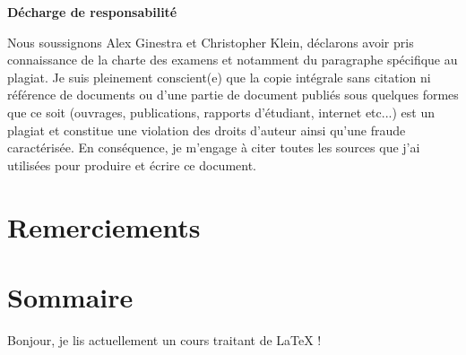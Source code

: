 \documentclass{article}
\begin{document}
\begin{center}
{\bfseries \huge D\'echarge de responsabilit\'e}
\end{center}
Nous soussignons Alex Ginestra et Christopher Klein, d\'eclarons avoir pris connaissance de la charte des examens et notamment du paragraphe sp\'ecifique au plagiat.\newline
Je suis pleinement conscient(e) que la copie int\'egrale sans citation ni r\'ef\'erence de documents ou d'une partie de document publi\'es sous quelques formes que ce soit (ouvrages, publications, rapports d'\'etudiant, internet etc...) est un plagiat et constitue une violation des droits d'auteur ainsi qu'une fraude caract\'eris\'ee.\newline
En cons\'equence, je m'engage \`{a} citer toutes les sources que j'ai utilis\'ees pour produire et \'ecrire ce document.
\cleardoublepage

\section{Remerciements}

\section{Sommaire}

Bonjour, je lis actuellement un cours traitant de LaTeX !
\end{document}
